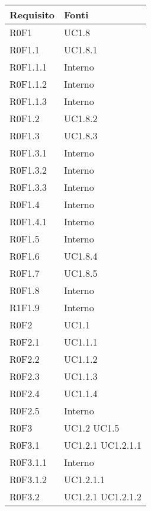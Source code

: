 	\begin{center}

	\def\arraystretch{1.5}
	\bgroup
	\begin{longtable}{| p{4cm} | p{4cm} |}

		\hline
		\textbf{Requisito} & \textbf{Fonti} \\
		\hline


		R0F1  & UC1.8 \\
		\hline
		R0F1.1  &  UC1.8.1 \\
		\hline
		R0F1.1.1  &  Interno \\
		\hline
		R0F1.1.2  &  Interno \\
		\hline
		R0F1.1.3  &  Interno \\
		\hline
		R0F1.2  &  UC1.8.2 \\
		\hline
		R0F1.3  &  UC1.8.3 \\
		\hline
		R0F1.3.1  &  Interno \\
		\hline
		R0F1.3.2  &  Interno \\
		\hline
		R0F1.3.3  &  Interno \\
		\hline
		R0F1.4  &  Interno \\
		\hline
		R0F1.4.1  &  Interno \\
		\hline
		R0F1.5  &  Interno \\
		\hline
		R0F1.6  &  UC1.8.4 \\
		\hline
		R0F1.7  &  UC1.8.5 \\
		\hline
		R0F1.8  &  Interno \\
		\hline
		R1F1.9  &  Interno \\
		\hline
		R0F2  &  UC1.1 \\
		\hline
		R0F2.1  &  UC1.1.1 \\
		\hline
		R0F2.2  &  UC1.1.2 \\
		\hline
		R0F2.3  &  UC1.1.3 \\
		\hline
		R0F2.4  &  UC1.1.4 \\
		\hline
		R0F2.5  &  Interno  \\
		\hline
		R0F3  &  UC1.2 \newline UC1.5 \\
		\hline
		R0F3.1  &  UC1.2.1 \newline UC1.2.1.1 \\
		\hline
		R0F3.1.1  &  Interno \\
		\hline
		R0F3.1.2  &  UC1.2.1.1 \\
		\hline
		R0F3.2  &  UC1.2.1 \newline UC1.2.1.2 \\

\end{longtable}
\end{center}
